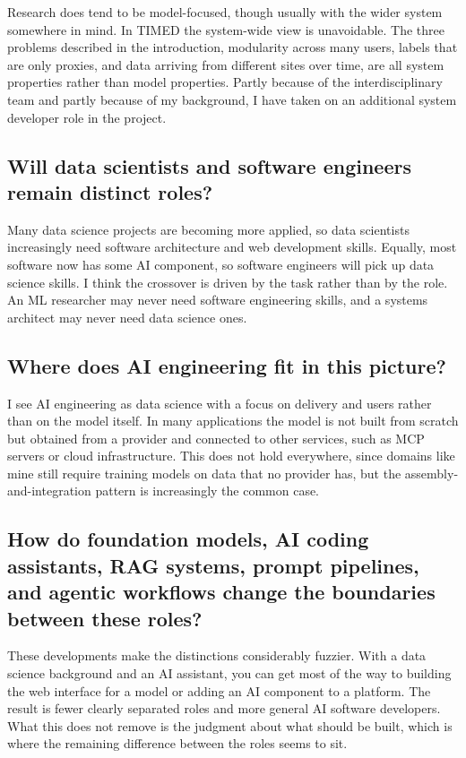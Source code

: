 \documentclass{article}
\begin{document}
Research does tend to be model-focused, though usually with the wider system somewhere in mind. In TIMED the system-wide view is unavoidable. The three problems described in the introduction, modularity across many users, labels that are only proxies, and data arriving from different sites over time, are all system properties rather than model properties. Partly because of the interdisciplinary team and partly because of my background, I have taken on an additional system developer role in the project.

\subsection*{Will data scientists and software engineers remain distinct roles?}

Many data science projects are becoming more applied, so data scientists increasingly need software architecture and web development skills. Equally, most software now has some AI component, so software engineers will pick up data science skills. I think the crossover is driven by the task rather than by the role. An ML researcher may never need software engineering skills, and a systems architect may never need data science ones.

\subsection*{Where does AI engineering fit in this picture?}

I see AI engineering as data science with a focus on delivery and users rather than on the model itself. In many applications the model is not built from scratch but obtained from a provider and connected to other services, such as MCP servers or cloud infrastructure. This does not hold everywhere, since domains like mine still require training models on data that no provider has, but the assembly-and-integration pattern is increasingly the common case.

\subsection*{How do foundation models, AI coding assistants, RAG systems, prompt pipelines, and agentic workflows change the boundaries between these roles?}

These developments make the distinctions considerably fuzzier. With a data science background and an AI assistant, you can get most of the way to building the web interface for a model or adding an AI component to a platform. The result is fewer clearly separated roles and more general AI software developers. What this does not remove is the judgment about what should be built, which is where the remaining difference between the roles seems to sit.
\end{document}
